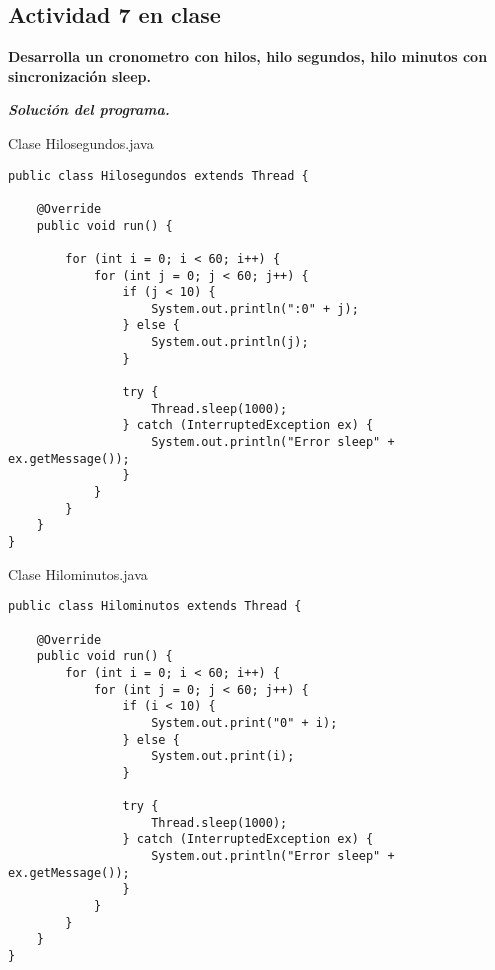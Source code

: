 {\raggedright
\subsection{Actividad 7 en clase}
}\vspace{.5cm}

\textbf{Desarrolla un cronometro con hilos, hilo segundos, hilo minutos con sincronización sleep.}\vspace{.2mm}

\textbf{\textit{Solución del programa.}}

\begin{center}
Clase Hilosegundos.java
\end{center}

\begin{verbatim}
public class Hilosegundos extends Thread {

    @Override
    public void run() {

        for (int i = 0; i < 60; i++) {
            for (int j = 0; j < 60; j++) {
                if (j < 10) {
                    System.out.println(":0" + j);
                } else {
                    System.out.println(j);
                }

                try {
                    Thread.sleep(1000);
                } catch (InterruptedException ex) {
                    System.out.println("Error sleep" + ex.getMessage());
                }
            }
        }
    }
}
\end{verbatim} \vspace{1cm}

\begin{center}
Clase Hilominutos.java
\end{center}

\begin{verbatim}
public class Hilominutos extends Thread {

    @Override
    public void run() {
        for (int i = 0; i < 60; i++) {
            for (int j = 0; j < 60; j++) {
                if (i < 10) {
                    System.out.print("0" + i);
                } else {
                    System.out.print(i);
                }

                try {
                    Thread.sleep(1000);
                } catch (InterruptedException ex) {
                    System.out.println("Error sleep" + ex.getMessage());
                }
            }
        }
    }
}
\end{verbatim} \vspace{1cm}


